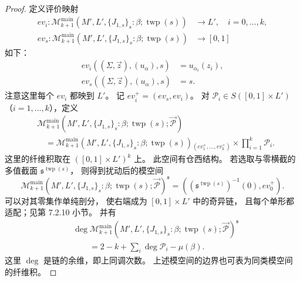 \begin{proof}
定义评价映射
\[
\begin{aligned}
ev_i\colon\mathcal M_{k+1}^{\mathrm{main}}
(M',L',\{J_{1,s}\}_s:\beta;\operatorname{twp}(s))
&\longrightarrow L',\quad i=0,\ldots,k,\\
ev_s\colon\mathcal M_{k+1}^{\mathrm{main}}
(M',L',\{J_{1,s}\}_s:\beta;\operatorname{twp}(s))
&\longrightarrow[0,1]
\end{aligned}
\]
如下：
\begin{align}
ev_i((\Sigma,\vec z),(u_\alpha),s)
 &=u_{\alpha_i}(z_i),
 \tag{4.6.35.1}\label{eq:4-6-35-1}\\
ev_s((\Sigma,\vec z),(u_\alpha),s)
 &=s.
 \tag{4.6.35.2}\label{eq:4-6-35-2}
\end{align}
注意这里每个 $ev_i$ 都映到 $L'$。
记 $ev_i^+=(ev_s,ev_i)$。
对 $\mathcal P_i\in S([0,1]\times L')$
（$i=1,\ldots,k$），定义
\[
\begin{aligned}
&\mathcal M_{k+1}^{\mathrm{main}}
(M',L',\{J_{1,s}\}_s:
\beta;\operatorname{twp}(s);\vec{\mathcal P})\\
&\quad=
\mathcal M_{k+1}^{\mathrm{main}}
(M',L',\{J_{1,s}\}_s:
\beta;\operatorname{twp}(s))
{}_{(ev_1^+,\ldots,ev_k^+)}\!\times
\prod_{i=1}^k\mathcal P_i .
\end{aligned}
\]
这里的纤维积取在 $([0,1]\times L')^k$ 上。
此空间有仓西结构。
若选取与零横截的多值截面
$\mathfrak s^{\operatorname{twp}(s)}$，
则得到扰动后的模空间
\[
\mathcal M_{k+1}^{\mathrm{main}}
(M',L',\{J_{1,s}\}_s:
\beta;\operatorname{twp}(s);\vec{\mathcal P})
^{\mathfrak s}
=((\mathfrak s^{\operatorname{twp}(s)})^{-1}(0),ev_0^+).
\]
可以对其零集作单纯剖分，
使右端成为 $[0,1]\times L'$ 中的奇异链，
且每个单形都适配；见第 7.2.10 小节。
并有
\begin{equation}
\begin{aligned}
&\deg\mathcal M_{k+1}^{\mathrm{main}}
(M',L',\{J_{1,s}\}_s:
\beta;\operatorname{twp}(s);\vec{\mathcal P})
^{\mathfrak s}\\
&\qquad=2-k+\sum_i\deg\mathcal P_i-\mu(\beta).
\end{aligned}
\tag{4.6.36.1}\label{eq:4-6-36-1}
\end{equation}
这里 $\deg$ 是链的余维，即上同调次数。
上述模空间的边界也可表为同类模空间的纤维积。


\end{proof}
